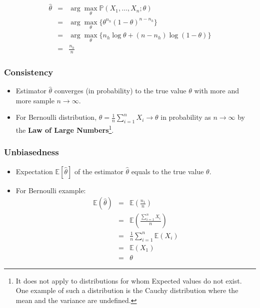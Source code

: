 \documentclass[letterpaper, 10pt, twocolumn]{article}
\begin{document}
\begin{equation}
\begin{array}{rcl}
\hat{\theta} & = & \arg\max_{\theta} \mathbb{P}(X_1,\dots,X_n;\theta) \\
			 & = & \arg\max_{\theta} \{\theta^{n_h}(1-\theta)^{n-n_h}\} \\
			 & = & \arg\max_{\theta} \{n_h\log\theta+(n-n_h)\log(1-\theta)\} \\
			 & = & \frac{n_h}{n}
\end{array}
\end{equation}

\subsubsection{Consistency}

\begin{itemize}
	\item Estimator $\hat{\theta}$ converges (in probability) to the true value $\theta$ with more and more sample $n\rightarrow\infty$.
	\item For Bernoulli distribution, $\hat{\theta}=\frac{1}{n}\sum_{i=1}^{n}{X_i} \rightarrow \theta$ in probability as $n \rightarrow \infty$ by the \textbf{Law of Large Numbers}\footnote{It does not apply to distributions for whom Expected values do not exist. One example of such a distribution is the Cauchy distribution where the mean and the variance are undefined.}.
\end{itemize}


\subsubsection{Unbiasedness}

\begin{itemize}
	\item Expectation $\mathbb{E}[\hat{\theta}]$ of the estimator $\hat{\theta}$ equals to the true value $\theta$.
	\item For Bernoulli example:
	\begin{equation}
	\begin{array}{rcl}
	\mathbb{E}(\hat{\theta}) & = & \mathbb{E}(\frac{n_1}{n}) \\
	& = & \mathbb{E}(\frac{\sum_{i=1}^{n}X_i}{n}) \\
	& = & \frac{1}{n}\sum_{i=1}^{n}{\mathbb{E}(X_i)} \\
	& = & \mathbb{E}(X_1) \\
	& = & \theta
	\end{array}
	\end{equation}
\end{itemize}
\end{document}
